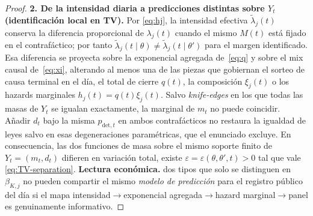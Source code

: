 \documentclass[12pt]{article}
\theoremstyle{definition}
\theoremstyle{remark}
\newcommand{\1}{\mathbf{1}}
\begin{document}
\begin{proof}
\smallskip
\noindent\textbf{2. De la intensidad diaria a predicciones distintas sobre $Y_t$ \textup{(}identificación local en TV\textup{)}.}
Por \eqref{eq:hj}, la intensidad efectiva $\tilde{\lambda}_j(t)$ conserva la diferencia proporcional de $\lambda_j(t)$ cuando el mismo $M(t)$ está fijado en el contrafáctico; por tanto $\tilde{\lambda}_j(t\mid\theta)\neq\tilde{\lambda}_j(t\mid\theta')$ para el margen identificado. Esa diferencia se proyecta sobre la exponencial agregada de~\eqref{eq:q} y sobre el mix causal de~\eqref{eq:xi}, alterando al menos una de las piezas que gobiernan el sorteo de causa terminal en el día, el total de cierre $q(t)$, la composición $\xi_j(t)$ o los hazards marginales $h_j(t)=q(t)\xi_j(t)$. Salvo \emph{knife-edges} en los que todas las masas de $Y_t$ se igualan exactamente, la marginal de $m_t$ no puede coincidir. Añadir $d_t$ bajo la misma $p_{\mathrm{det},t}$ en ambos contrafácticos no restaura la igualdad de leyes salvo en esas degeneraciones paramétricas, que el enunciado excluye. En consecuencia, las dos funciones de masa sobre el mismo soporte finito de $Y_t=(m_t,d_t)$ difieren en variación total, existe $\varepsilon=\varepsilon(\theta,\theta',t)>0$ tal que vale \eqref{eq:TV-separation}. \textbf{Lectura económica.} dos tipos que solo se distinguen en $\beta_{K,j}$ no pueden compartir el mismo \emph{modelo de predicción} para el registro público del día si el mapa intensidad$\to$exponencial agregada$\to$hazard marginal$\to$panel es genuinamente informativo.


\end{proof}
\end{document}
